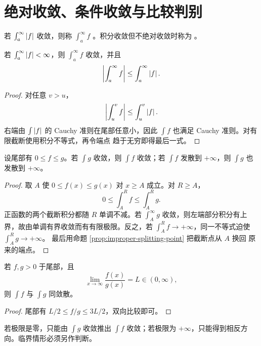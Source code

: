 \section{绝对收敛、条件收敛与比较判别}

\begin{definition}
若 \(\int_a^\infty\left|f\right|\) 收敛，则称
\(\int_a^\infty f\) 。积分收敛但不绝对收敛时称为
。
\end{definition}

\begin{theorem}[绝对收敛蕴含收敛]
\label{thm:improper-absolute-convergence}
若 \(\int_a^\infty\left|f\right|<\infty\)，则
\(\int_a^\infty f\) 收敛，并且
\[
 \left|\int_a^\infty f\right|
 \le\int_a^\infty\left|f\right|.
\]
\end{theorem}

\begin{proof}
对任意 \(v>u\)，
\[
 \left|\int_u^v f\right|\le\int_u^v\left|f\right|.
\]
右端由 \(\int\left|f\right|\) 的 Cauchy 准则在尾部任意小，因此
\(\int f\) 也满足 Cauchy 准则。对有限截断使用积分不等式，再令端点
趋于无穷即得最后一式。
\end{proof}

\begin{theorem}[比较判别]
\label{thm:improper-comparison}
设尾部有 \(0\le f\le g\)。若 \(\int g\) 收敛，则 \(\int f\)
收敛；若 \(\int f\) 发散到 \(+\infty\)，则 \(\int g\) 也发散到
\(+\infty\)。
\end{theorem}

\begin{proof}
取 \(A\) 使 \(0\le f(x)\le g(x)\) 对 \(x\ge A\) 成立。对 \(R\ge A\)，
\[
 0\le\int_A^R f\le\int_A^R g.
\]
正函数的两个截断积分都随 \(R\) 单调不减。若 \(\int_A^\infty g\)
收敛，则左端部分积分有上界，故由单调有界收敛而有有限极限。反之，若
\(\int_A^R f\to+\infty\)，同一不等式迫使 \(\int_A^R g\to+\infty\)。
最后用命题 \ref{prop:improper-splitting-point} 把截断点从 \(A\) 换回
原来的端点。
\end{proof}

\begin{corollary}[极限比较]
若 \(f,g>0\) 于尾部，且
\[
 \lim_{x\to\infty}\frac{f(x)}{g(x)}=L\in(0,\infty),
\]
则 \(\int f\) 与 \(\int g\) 同敛散。
\end{corollary}

\begin{proof}
尾部有 \(L/2\le f/g\le 3L/2\)，双向比较即可。
\end{proof}

若极限是零，只能由 \(\int g\) 收敛推出 \(\int f\) 收敛；若极限为
\(+\infty\)，只能得到相反方向。临界情形必须另作判断。

